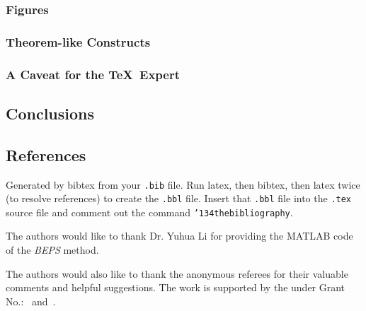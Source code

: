 \subsubsection{Figures}
\subsubsection{Theorem-like Constructs}
\subsubsection*{A Caveat for the \TeX\ Expert}
\subsection{Conclusions}
\subsection{References}
Generated by bibtex from your \texttt{.bib} file.  Run latex,
then bibtex, then latex twice (to resolve references)
to create the \texttt{.bbl} file.  Insert that \texttt{.bbl}
file into the \texttt{.tex} source file and comment out
the command \texttt{{\char'134}thebibliography}.

\begin{acks}
  The authors would like to thank Dr. Yuhua Li for providing the
  MATLAB code of the \textit{BEPS} method.

  The authors would also like to thank the anonymous referees for
  their valuable comments and helpful suggestions. The work is
  supported by the  under Grant
  No.:~
  and~.

\end{acks}
